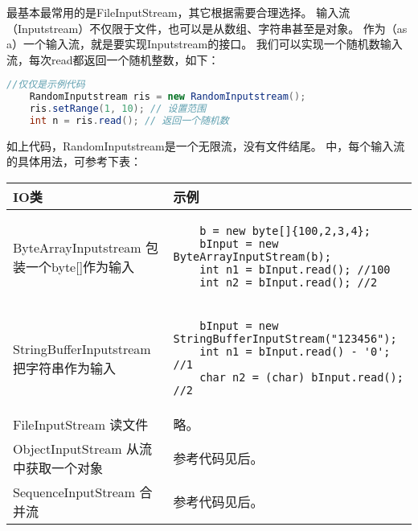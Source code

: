 \noindent
最基本最常用的是FileInputStream，其它根据需要合理选择。
输入流（Inputstream）不仅限于文件，也可以是从数组、字符串甚至是对象。
作为（as a）一个输入流，就是要实现Inputstream的接口。
我们可以实现一个随机数输入流，每次read都返回一个随机整数，如下：
\vspace{0.3cm}
\begin{lstlisting}[language=Java]
	//仅仅是示例代码
	RandomInputstream ris = new RandomInputstream();
	ris.setRange(1, 10); // 设置范围
	int n = ris.read(); // 返回一个随机数
\end{lstlisting}
\noindent
如上代码，RandomInputstream是一个无限流，没有文件结尾。
中，每个输入流的具体用法，可参考下表：
\vspace{0.3cm}
\begin{table}[!htbp]\centering
	\lstset{frame=none, language=Java}
	\begin{tabular}{|p{4cm}|p{9cm}|}
	\hline
	IO类&示例\\ 
	\hline
	ByteArrayInputstream \newline 包装一个byte[]作为输入&
\begin{lstlisting}
	b = new byte[]{100,2,3,4};
	bInput = new ByteArrayInputStream(b);
	int n1 = bInput.read(); //100
	int n2 = bInput.read(); //2
\end{lstlisting} \\
	\hline
	StringBufferInputstream \newline 把字符串作为输入&
\begin{lstlisting}
	bInput = new StringBufferInputStream("123456");
	int n1 = bInput.read() - '0'; //1
	char n2 = (char) bInput.read(); //2
\end{lstlisting} \\
	\hline
	FileInputStream \newline 读文件& 略。\\
	\hline
	ObjectInputStream \newline 从流中获取一个对象&参考代码见后。\\
	\hline
	SequenceInputStream \newline 合并流&参考代码见后。\\
	\hline
	\end{tabular}
\end{table}

